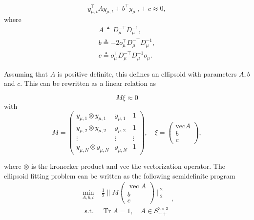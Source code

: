 \begin{equation}
	\label{eq:calib_elipsoid}
	y_{\mu, t}^{\top} A y_{\mu, t}+b^{\top} y_{\mu, t}+c \approx 0,
\end{equation}
where
\begin{subequations}
	\label{eq:calib_elipsoid_components}
	\begin{align}
		A \triangleq D_\mu^{-\top} D_\mu^{-1}, \\
		b \triangleq-2 o_\mu^{\top} D_\mu^{-\top} D_\mu^{-1}, \\
		c \triangleq o_\mu^{\top} D_\mu^{-\top} D_\mu^{-1} o_\mu.
	\end{align}
\end{subequations}

Assuming that $A$ is positive definite, this defines an ellipsoid with parameters $A, b$ and $c$. This can be rewritten as a linear relation as

\begin{equation}
	M \xi \approx 0
\end{equation}
with
\begin{equation}
	M=\left(\begin{array}{ccc}
		y_{\mu, 1} \otimes y_{\mu, 1} & y_{\mu, 1} & 1 \\
		y_{\mu, 2} \otimes y_{\mu, 2} & y_{\mu, 2} & 1 \\
		\vdots & \vdots & \vdots \\
		y_{\mu, N} \otimes y_{\mu, N} & y_{\mu, N} & 1
	\end{array}\right), \quad \xi=\left(\begin{array}{c}
		\mathrm{vec} A \\
		b \\
		c
	\end{array}\right),
\end{equation}

where $\otimes$ is the kronecker product and vec the vectorization operator.
The ellipsoid fitting problem can be written as the following semidefinite program \cite{Kok2016} 
\begin{equation}
	\begin{array}{ll}
		\min _{A, b, c} & \frac{1}{2}\|M\left(\begin{array}{c}
			\operatorname{vec} A \\
			b \\
			c
		\end{array}\right)\|_{2}^{2} \\
		\text { s.t. } & \operatorname{Tr} A=1, \quad A \in S_{++}^{3 \times 3}
	\end{array},
\end{equation}

